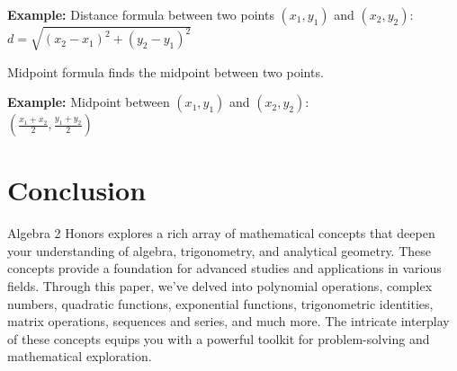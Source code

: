\documentclass{article}
\begin{document}
\begin{framed}
\textbf{Example:}
Distance formula between two points \((x_1, y_1)\) and \((x_2, y_2)\): \\
\(d = \sqrt{(x_2 - x_1)^2 + (y_2 - y_1)^2}\)
\end{framed}

Midpoint formula finds the midpoint between two points.

\begin{framed}
\textbf{Example:}
Midpoint between \((x_1, y_1)\) and \((x_2, y_2)\): \\
\(\left(\frac{x_1 + x_2}{2}, \frac{y_1 + y_2}{2}\right)\)
\end{framed}

\section{Conclusion}
Algebra 2 Honors explores a rich array of mathematical concepts that deepen your understanding of algebra, trigonometry, and analytical geometry. These concepts provide a foundation for advanced studies and applications in various fields. Through this paper, we've delved into polynomial operations, complex numbers, quadratic functions, exponential functions, trigonometric identities, matrix operations, sequences and series, and much more. The intricate interplay of these concepts equips you with a powerful toolkit for problem-solving and mathematical exploration.
\end{document}
